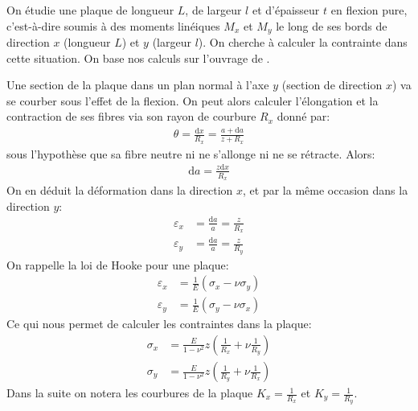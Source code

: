 \documentclass[11pt,titlepage]{article}
\begin{document}
On étudie une plaque de longueur $L$, de largeur $l$ et d'épaisseur $t$ en flexion pure, c'est-à-dire soumis à des moments linéiques $M_x$ et $M_y$ le long de ses bords de direction $x$ (longueur $L$) et $y$ (largeur $l$). On cherche à calculer la contrainte dans cette situation. On base nos calculs sur l'ouvrage de \cite{timo_plaque}.

Une section de la plaque dans un plan normal à l'axe $y$ (section de direction $x$) va se courber sous l'effet de la flexion. On peut alors calculer l'élongation et la contraction de ses fibres via son rayon de courbure $R_x$ donné par:
\begin{align}
    \theta = \frac{\mathrm{d}x}{R_x} = \frac{a+\mathrm{d}a}{z+R_x}
\end{align}
sous l'hypothèse que sa fibre neutre ni ne s'allonge ni ne se rétracte. Alors:
\begin{align}
    \mathrm{d}a = \frac{z\mathrm{d}x}{R_x}
\end{align}
On en déduit la déformation dans la direction $x$, et par la même occasion dans la direction $y$:
\begin{align}
    \varepsilon_x &= \frac{\mathrm{d}a}{a} = \frac{z}{R_x}\\
    \varepsilon_y &= \frac{\mathrm{d}a}{a} = \frac{z}{R_y}
\end{align}
On rappelle la loi de Hooke pour une plaque:
\begin{align}
    \varepsilon_x &= \frac{1}{E}\left ( \sigma_x - \nu \sigma_y \right )\\
    \varepsilon_y &= \frac{1}{E}\left ( \sigma_y - \nu \sigma_x \right )
\end{align}
Ce qui nous permet de calculer les contraintes dans la plaque:
\begin{align}
    \sigma_x &= \frac{E}{1-\nu^2}z\left (\frac{1}{R_x} + \nu \frac{1}{R_y}\right )\label{eq:cintragex}\\
    \sigma_y &= \frac{E}{1-\nu^2}z\left (\frac{1}{R_y} + \nu \frac{1}{R_x}\right ) \label{eq:cintragey}
\end{align}
Dans la suite on notera les courbures de la plaque $K_x = \frac{1}{R_x}$ et $K_y = \frac{1}{R_y}$. 
\end{document}
